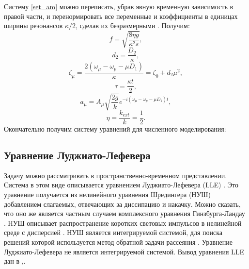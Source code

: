 Систему \eqref{set_am} можно переписать, убрав явную временную зависимость в правой части, и перенормировать все переменные и коэффициенты в единицах ширины резонансов $\kappa/2$, сделав их безразмерными \cite{Herr2012}. Получим:
\begin{equation}
f=\sqrt{\frac{8\eta g}{\kappa^2s}},
\end{equation}
\begin{equation}
d_2=\frac{D_2}{\kappa},
\end{equation}
\begin{equation}
\zeta_\mu=\frac{2(\omega_\mu-\omega_p-\mu D_1)}{\kappa}=\zeta_0+d_2\mu^2,
\end{equation}
\begin{equation}
\tau=\frac{\kappa t}{2},
\end{equation}
\begin{equation}\label{normirovka}
a_\mu=A_\mu\sqrt{\frac{2g}{k}}e^{-i(\omega_\mu-\omega_p-\mu D_1)t},
\end{equation}
\begin{equation}
\eta=\frac{k_{ext}}{k}=\frac{1}{2}.
\end{equation}
Окончательно получим систему уравнений для численного моделирования:


\subsection{Уравнение Луджиато-Лефевера}

Задачу можно рассматривать в пространственно-временном представлении. Система в этом виде описывается уравнением Луджиато-Лефевера (LLE) \cite{Lugiato1987}. Это уравнение получается из нелинейного уравнения Шредингера (НУШ) добавлением слагаемых, отвечающих за диссипацию и накачку. Можно сказать, что оно же является частным случаем комплексного уравнения Гинзбурга-Ландау \cite{Akhmediev2005}. НУШ описывает распространение коротких световых импульсов в нелинейной среде с дисперсией \cite{Boyd2008}. НУШ является интегрируемой системой, для поиска решений которой используется метод обратной задачи рассеяния \cite{Akhmediev2003}. Уравнение Луджиато-Лефевера не является интегрируемой системой. Вывод уравнения LLE дан в \cite{Matsko2011},\cite{Chembo2013}.

